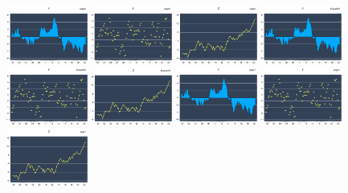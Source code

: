 \documentclass[
]{article}
\begin{document}
\begin{center}\includegraphics[width=0.2\textwidth]{test_files/figure-latex//eviews12-page2-GRAPH1} \includegraphics[width=0.2\textwidth]{test_files/figure-latex//eviews12-page2-GRAPH2} \includegraphics[width=0.2\textwidth]{test_files/figure-latex//eviews12-page2-GRAPH3} \includegraphics[width=0.2\textwidth]{test_files/figure-latex//eviews12-EviewsR3-GRAPH1} \includegraphics[width=0.2\textwidth]{test_files/figure-latex//eviews12-EviewsR3-GRAPH2} \includegraphics[width=0.2\textwidth]{test_files/figure-latex//eviews12-EviewsR3-GRAPH3} \includegraphics[width=0.2\textwidth]{test_files/figure-latex//eviews12-page1-GRAPH1} \includegraphics[width=0.2\textwidth]{test_files/figure-latex//eviews12-page1-GRAPH2} \includegraphics[width=0.2\textwidth]{test_files/figure-latex//eviews12-page1-GRAPH3} \end{center}
\end{document}
